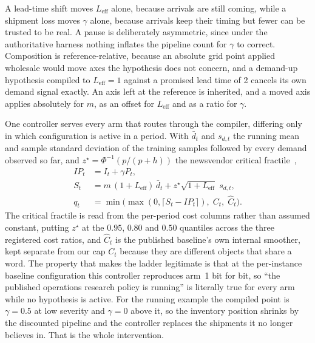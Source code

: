 A lead-time shift moves $L_{\mathrm{eff}}$ alone, because arrivals are still
coming, while a shipment loss moves $\gamma$ alone, because arrivals keep their
timing but fewer can be trusted to be real. A pause is deliberately asymmetric,
since under the authoritative harness nothing inflates the pipeline count for
$\gamma$ to correct. Composition is reference-relative, because an absolute grid
point applied wholesale would move axes the hypothesis does not concern, and a
demand-up hypothesis compiled to $L_{\mathrm{eff}} = 1$ against a promised lead
time of 2 cancels its own demand signal exactly. An axis left at the reference is
inherited, and a moved axis applies absolutely for $m$, as an offset for
$L_{\mathrm{eff}}$ and as a ratio for $\gamma$.

One controller serves every arm that routes through the compiler, differing only
in which configuration is active in a period. With $\bar{d}_t$ and $s_{d,t}$ the
running mean and sample standard deviation of the training samples followed by
every demand observed so far, and $z^\star = \Phi^{-1}(p/(p+h))$ the
newsvendor critical fractile~\cite{arrow-harris-marschak, zipkin-foundations},
\begin{align}
IP_t &= I_t + \gamma P_t, \\
S_t  &= m\,(1 + L_{\mathrm{eff}})\,\bar{d}_t
        + z^\star \sqrt{1 + L_{\mathrm{eff}}}\; s_{d,t}, \\
q_t  &= \min\bigl(\max(0, \lceil S_t - IP_t \rceil),\; C_t,\; \hat{C}_t\bigr).
\end{align}
The critical fractile is read from the per-period cost columns rather than
assumed constant, putting $z^\star$ at the $0.95$, $0.80$ and $0.50$ quantiles
across the three registered cost ratios, and $\hat{C}_t$ is the published
baseline's own internal smoother, kept separate from our cap $C_t$ because they
are different objects that share a word. The property that makes the ladder
legitimate is that at the per-instance baseline configuration this controller
reproduces arm~1 bit for bit, so ``the published operations research policy is
running'' is literally true for every arm while no hypothesis is active. For the
running example the compiled point is $\gamma = 0.5$ at low severity and
$\gamma = 0$ above it, so the inventory position shrinks by the discounted
pipeline and the controller replaces the shipments it no longer believes in. That
is the whole intervention.

